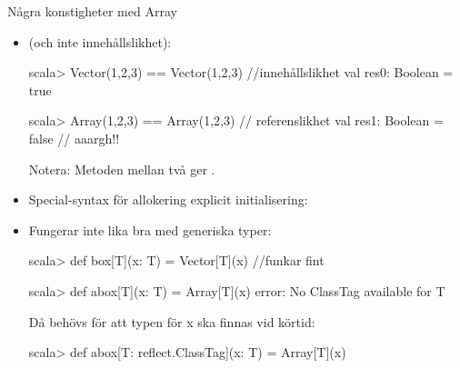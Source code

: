 \begin{Slide}{Några konstigheter med Array}
\begin{itemize}\SlideFontSmall
\item {} (och inte innehållslikhet): 
\begin{REPLsmall}
scala> Vector(1,2,3) == Vector(1,2,3) //innehållslikhet
val res0: Boolean = true

scala> Array(1,2,3) == Array(1,2,3) // referenslikhet
val res1: Boolean = false  // aaargh!!
\end{REPLsmall}
Notera: Metoden \code{==} mellan två  ger .
\item Special-syntax för allokering  explicit initialisering: \\
{\SlideFontSmall{}}
\item Fungerar inte lika bra med generiska typer:
\begin{REPLsmall}
scala> def box[T](x: T) = Vector[T](x)  //funkar fint

scala> def abox[T](x: T) = Array[T](x)
  error: No ClassTag available for T
\end{REPLsmall}
\pause
Då behövs  för att typen för x ska finnas vid körtid:
\begin{REPLsmall}
scala> def abox[T: reflect.ClassTag](x: T) = Array[T](x)
\end{REPLsmall}

\end{itemize}
\end{Slide}

